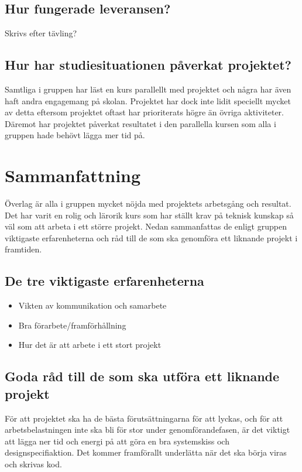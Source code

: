 \documentclass[11pt]{article}
\begin{document}
\subsection{Hur fungerade leveransen?}
Skrivs efter tävling?

\subsection{Hur har studiesituationen påverkat projektet?}
Samtliga i gruppen har läst en kurs parallellt med projektet och några har även haft andra engagemang på skolan. Projektet har dock inte lidit speciellt mycket av detta eftersom projektet oftast har prioriterats högre än övriga aktiviteter. Däremot har projektet påverkat resultatet i den parallella kursen som alla i gruppen hade behövt lägga mer tid på.  

\section{Sammanfattning}
Överlag är alla i gruppen mycket nöjda med projektets arbetsgång och resultat. Det har varit en rolig och lärorik kurs som har ställt krav på teknisk kunskap så väl som att arbeta i ett större projekt. Nedan sammanfattas de enligt gruppen viktigaste erfarenheterna och råd till de som ska genomföra ett liknande projekt i framtiden.

\subsection{De tre viktigaste erfarenheterna}
\begin{itemize}
\item Vikten av kommunikation och samarbete
\item Bra förarbete/framförhållning
\item Hur det är att arbete i ett stort projekt
\end{itemize} 

\subsection{Goda råd till de som ska utföra ett liknande projekt}
För att projektet ska ha de bästa förutsättningarna för att lyckas, och för att arbetsbelastningen inte ska bli för stor under genomförandefasen, är det viktigt att lägga ner tid och energi på att göra en bra systemskiss och designspecifiaktion. Det kommer framförallt underlätta när det ska börja viras och skrivas kod. 
\end{document}
